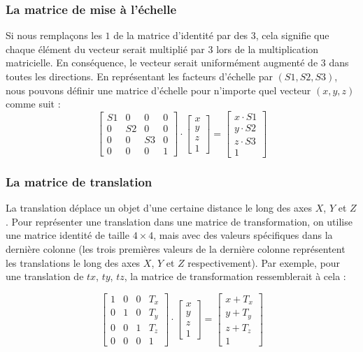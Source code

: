 \subsubsection*{La matrice de mise à l'échelle}

Si nous remplaçons les $1$ de la matrice d'identité par des $3$, cela signifie que chaque élément du vecteur serait multiplié par $3$ lors de la multiplication matricielle. En conséquence, le vecteur serait uniformément augmenté de $3$ dans toutes les directions. En représentant les facteurs d'échelle par $(S1, S2, S3)$, nous pouvons définir une matrice d'échelle pour n'importe quel vecteur $(x, y, z)$ comme suit :
\[
\begin{bmatrix}
S1 & 0 & 0 & 0\\
0 & S2 & 0 & 0\\
0 & 0 & S3 & 0\\
0 & 0 & 0 & 1
\end{bmatrix}
\cdot
\begin{bmatrix}
x\\
y\\
z\\
1
\end{bmatrix}
=
\begin{bmatrix}
x \cdot S1\\
y \cdot S2\\
z \cdot S3\\
1
\end{bmatrix}
\]


\subsubsection*{La matrice de translation}

La translation déplace un objet d'une certaine distance le long des axes $X$, $Y$ et $Z$. Pour représenter une translation dans une matrice de transformation, on utilise une matrice identité de taille $4\times4$, mais avec des valeurs spécifiques dans la dernière colonne (les trois premières valeurs de la dernière colonne représentent les translations le long des axes $X$, $Y$ et $Z$ respectivement). Par exemple, pour une translation de $tx$, $ty$, $tz$, la matrice de transformation ressemblerait à cela :

\[
\begin{bmatrix}
1 & 0 & 0 & T_x\\
0 & 1 & 0 & T_y\\
0 & 0 & 1 & T_z\\
0 & 0 & 0 & 1
\end{bmatrix}
\cdot
\begin{bmatrix}
x\\
y\\
z\\
1
\end{bmatrix}
=
\begin{bmatrix}
x + T_x\\
y + T_y\\
z + T_z\\
1
\end{bmatrix}
\]


